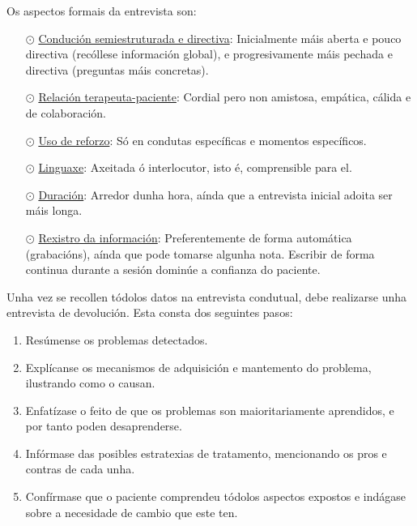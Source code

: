 \documentclass[a4paper,11pt]{article}
\begin{document}
Os aspectos formais da entrevista son:
\begin{itemize}
	\item[$\odot$] \underline{Condución semiestruturada e directiva}: Inicialmente máis aberta e 
	pouco directiva (recóllese información global), e progresivamente máis pechada e directiva 
	(preguntas máis concretas). 
	\item[$\odot$] \underline{Relación terapeuta-paciente}: Cordial pero non amistosa, empática, 
	cálida e de colaboración.
	\item[$\odot$] \underline{Uso de reforzo}: Só en condutas específicas e momentos específicos.
	\item[$\odot$] \underline{Linguaxe}: Axeitada ó interlocutor, isto é, comprensible para el.
	\item[$\odot$] \underline{Duración}: Arredor dunha hora, aínda que a entrevista inicial adoita 
	ser máis longa.
	\item[$\odot$] \underline{Rexistro da información}: Preferentemente de forma automática 
	(grabacións), aínda que pode tomarse algunha nota. Escribir de forma continua durante a sesión 
	dominúe a confianza do paciente.
\end{itemize}

Unha vez se recollen tódolos datos na entrevista condutual, debe realizarse unha entrevista de devolución. Esta consta dos seguintes pasos:
\begin{enumerate}
	\item Resúmense os problemas detectados.
	\item Explícanse os mecanismos de adquisición e mantemento do problema, ilustrando como o causan.
	\item Enfatízase o feito de que os problemas son maioritariamente aprendidos, e por tanto poden 
	desaprenderse.
	\item Infórmase das posibles estratexias de tratamento, mencionando os pros e contras de cada 
	unha.
	\item Confírmase que o paciente comprendeu tódolos aspectos expostos e indágase sobre a 
	necesidade de cambio que este ten.
\end{enumerate}
\end{document}
